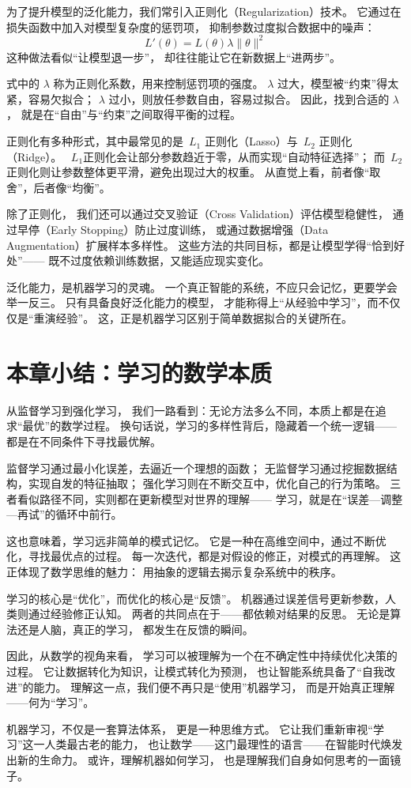 为了提升模型的泛化能力，我们常引入正则化（Regularization）技术。  
它通过在损失函数中加入对模型复杂度的惩罚项，  
抑制参数过度拟合数据中的噪声：
$$
L'(\theta) = L(\theta)  \lambda \|\theta\|^2
$$  
这种做法看似“让模型退一步”，  
却往往能让它在新数据上“进两步”。

式中的 $\lambda$ 称为正则化系数，用来控制惩罚项的强度。  
$\lambda$ 过大，模型被“约束”得太紧，容易欠拟合；  
$\lambda$ 过小，则放任参数自由，容易过拟合。  
因此，找到合适的 $\lambda$，  
就是在“自由”与“约束”之间取得平衡的过程。

正则化有多种形式，其中最常见的是~$L_1$ 正则化（Lasso）与~$L_2$ 正则化（Ridge）。  
~$L_1$正则化会让部分参数趋近于零，从而实现“自动特征选择”；  
而~$L_2$ 正则化则让参数整体更平滑，避免出现过大的权重。  
从直觉上看，前者像“取舍”，后者像“均衡”。

除了正则化，  
我们还可以通过交叉验证（Cross Validation）评估模型稳健性，  
通过早停（Early Stopping）防止过度训练，  
或通过数据增强（Data Augmentation）扩展样本多样性。  
这些方法的共同目标，都是让模型学得“恰到好处”——  
既不过度依赖训练数据，又能适应现实变化。

泛化能力，是机器学习的灵魂。  
一个真正智能的系统，不应只会记忆，更要学会举一反三。  
只有具备良好泛化能力的模型，  
才能称得上“从经验中学习”，而不仅仅是“重演经验”。  
这，正是机器学习区别于简单数据拟合的关键所在。

\section{本章小结：学习的数学本质}

从监督学习到强化学习，  
我们一路看到：无论方法多么不同，本质上都是在追求“最优”的数学过程。  
换句话说，学习的多样性背后，隐藏着一个统一逻辑——  
都是在不同条件下寻找最优解。

监督学习通过最小化误差，去逼近一个理想的函数；  
无监督学习通过挖掘数据结构，实现自发的特征抽取；  
强化学习则在不断交互中，优化自己的行为策略。  
三者看似路径不同，实则都在更新模型对世界的理解——  
学习，就是在“误差—调整—再试”的循环中前行。

这也意味着，学习远非简单的模式记忆。  
它是一种在高维空间中，通过不断优化，寻找最优点的过程。  
每一次迭代，都是对假设的修正，对模式的再理解。  
这正体现了数学思维的魅力：  
用抽象的逻辑去揭示复杂系统中的秩序。

学习的核心是“优化”，而优化的核心是“反馈”。  
机器通过误差信号更新参数，人类则通过经验修正认知。  
两者的共同点在于——都依赖对结果的反思。  
无论是算法还是人脑，真正的学习，  
都发生在反馈的瞬间。

因此，从数学的视角来看，  
学习可以被理解为一个在不确定性中持续优化决策的过程。  
它让数据转化为知识，让模式转化为预测，  
也让智能系统具备了“自我改进”的能力。  
理解这一点，我们便不再只是“使用”机器学习，  
而是开始真正理解——何为“学习”。

机器学习，不仅是一套算法体系，  
更是一种思维方式。  
它让我们重新审视“学习”这一人类最古老的能力，  
也让数学——这门最理性的语言——在智能时代焕发出新的生命力。  
或许，理解机器如何学习，  
也是理解我们自身如何思考的一面镜子。

\nocite{*}
\newpage
